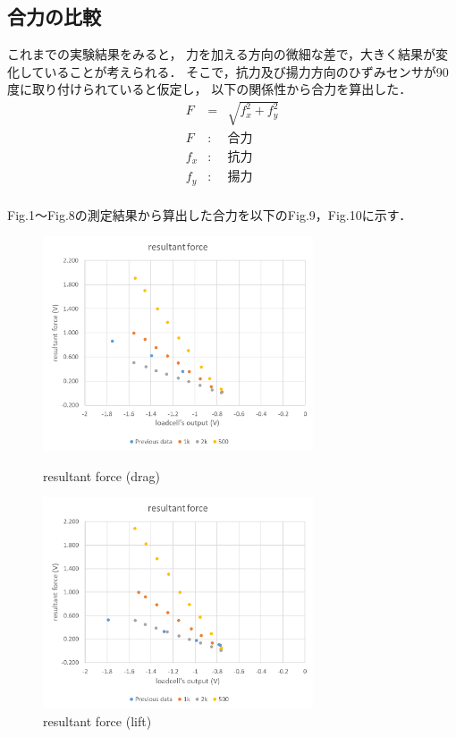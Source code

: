 \documentclass[twocolumn,a4j]{jsarticle}
\begin{document}
\subsection{合力の比較}
これまでの実験結果をみると，
力を加える方向の微細な差で，大きく結果が変化していることが考えられる．
そこで，抗力及び揚力方向のひずみセンサが90度に取り付けられていると仮定し，
以下の関係性から合力を算出した．
\begin{eqnarray*}
    F &=& \sqrt{f_x ^2 + f_y ^2} \\
    F &:& 合力\\
    f_x &:& 抗力\\
    f_y &:& 揚力\\
\end{eqnarray*}\par
Fig.1～Fig.8の測定結果から算出した合力を以下のFig.9，Fig.10に示す．
\begin{figure}[htbp]
    \footnotesize
    \begin{center}
        \includegraphics[width=80mm]{../images/resultantforce_drag.png}
        \caption{resultant force (drag)}
        \includegraphics[width=80mm]{../images/resultantforce_lift.png}
        \caption{resultant force (lift)}
    \end{center}
\end{figure}\par
\end{document}
